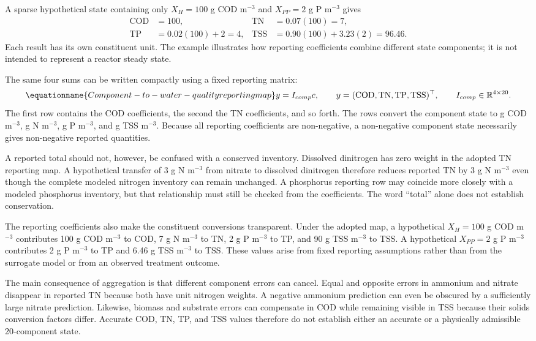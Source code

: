 A sparse hypothetical state containing only
$X_H=100$ g COD m$^{-3}$ and
$X_{PP}=2$ g P m$^{-3}$ gives
\[
\begin{aligned}
\mathrm{COD}&=100, &\mathrm{TN}&=0.07(100)=7,\\
\mathrm{TP}&=0.02(100)+2=4,
&\mathrm{TSS}&=0.90(100)+3.23(2)=96.46.
\end{aligned}
\]
Each result has its own constituent unit. The example illustrates how reporting coefficients combine different state components; it is not intended to represent a reactor steady state.

The same four sums can be written compactly using a fixed reporting matrix:
\begin{equation}
\equationname{Component-to-water-quality reporting map}
y=I_{comp}c,\qquad
y=(\mathrm{COD},\mathrm{TN},\mathrm{TP},\mathrm{TSS})^\top,\qquad
I_{comp}\in\mathbb{R}^{4\times20}.
\label{eq:component_composite_map}
\end{equation}
The first row contains the COD coefficients, the second the TN coefficients, and so forth. The rows convert the component state to g COD m$^{-3}$, g N m$^{-3}$, g P m$^{-3}$, and g TSS m$^{-3}$. Because all reporting coefficients are non-negative, a non-negative component state necessarily gives non-negative reported quantities.

A reported total should not, however, be confused with a conserved inventory. Dissolved dinitrogen has zero weight in the adopted TN reporting map. A hypothetical transfer of 3 g N m$^{-3}$ from nitrate to dissolved dinitrogen therefore reduces reported TN by 3 g N m$^{-3}$ even though the complete modeled nitrogen inventory can remain unchanged. A phosphorus reporting row may coincide more closely with a modeled phosphorus inventory, but that relationship must still be checked from the coefficients. The word ``total'' alone does not establish conservation.

The reporting coefficients also make the constituent conversions transparent. Under the adopted map, a hypothetical
$X_H=100$ g COD m$^{-3}$ contributes
100 g COD m$^{-3}$ to COD,
7 g N m$^{-3}$ to TN,
2 g P m$^{-3}$ to TP, and
90 g TSS m$^{-3}$ to TSS.
A hypothetical
$X_{PP}=2$ g P m$^{-3}$ contributes
2 g P m$^{-3}$ to TP and
6.46 g TSS m$^{-3}$ to TSS.
These values arise from fixed reporting assumptions rather than from the surrogate model or from an observed treatment outcome.

The main consequence of aggregation is that different component errors can cancel. Equal and opposite errors in ammonium and nitrate disappear in reported TN because both have unit nitrogen weights. A negative ammonium prediction can even be obscured by a sufficiently large nitrate prediction. Likewise, biomass and substrate errors can compensate in COD while remaining visible in TSS because their solids conversion factors differ. Accurate COD, TN, TP, and TSS values therefore do not establish either an accurate or a physically admissible 20-component state.

